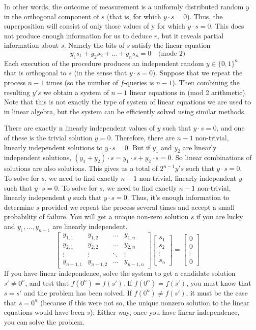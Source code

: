 \documentclass[12pt, oneside]{book}
\theoremstyle{definition}
\theoremstyle{definition}
\theoremstyle{remark}
\begin{document}
In other words, the outcome of measurement is a uniformly distributed random $y$ in the orthogonal component of $s$ (that is, for which $y\cdot s=0$). Thus, the superposition will consist of only those values of y for which $y\cdot s=0$. This does not produce enough information for us to deduce $r$, but it reveals partial information about $s$. Namely the bits of $s$ satisfy the linear equation
\[
y_1s_1+y_2s_2+\ldots+y_ns_n = 0 \quad \text{(mode 2)}
\]
Each execution of the procedure produces an independent random $y\in\{0,1\}^n$ that is orthogonal to $s$ (in the sense that $y\cdot s=0$). Suppose that we repeat the process $n-1$ times (so the number of $f$-queries is $n-1$). Then combining the resulting $y's$ we obtain a system of $n-1$ linear equations in (mod 2 arithmetic). Note that this is not exactly the type of system of linear equations we are used to in linear algebra, but the system can be efficiently solved using similar methods. 

There are exactly n linearly independent values of $y$ such that $y\cdot s=0$, and one of these is the trivial solution $y=0$. Therefore, there are $n-1$ non-trivial, linearly independent solutions to $y\cdot s=0$. But if $y_1$ and $y_2$ are linearly independent solutions, $(y_1+y_2)\cdot s=y_1\cdot s+y_2 \cdot s=0$. So linear combinations of solutions are also solutions. This gives us a total of $2^{n-1}y's$ such that $y\cdot s=0$. To solve for $s$, we need to find exactly $n-1$ non-trivial, linearly independent $y$ such that $y\cdot s=0$. To solve for $s$, we need to find exactly $n-1$ non-trivial, linearly independent $y$ such that $y\cdot s=0$. Thus, it's enough information to determine $s$ provided we repeat the process several times and accept a small probability of failure.  You will get a unique non-zero solution $s$ if you are lucky and $y_1,\ldots,y_{n-1}$ are linearly independent.
\[
\begin{bmatrix} y_{1,1} & y_{1,2}  & \ldots & y_{1,n} \\ 
y_{2,1} & y_{2,2} & \ldots & y_{2,n} \\ \vdots & \vdots & \ddots & \vdots \\ y_{n-1,1} & y_{n-1,2} & \ldots & y_{n-1,n} \end{bmatrix}\begin{bmatrix} s_1 \\ s_2 \\ \vdots \\ s_n \end{bmatrix}=\begin{bmatrix}0 \\ 0 \\ \vdots \\ 0 \end{bmatrix}
\]
If you have linear independence, solve the system to get a candidate solution $s'\neq 0^n$, and test that $f(0^n)=f(s')$. If $f(0^n)=f(s')$, you must know that $s=s'$ and the problem has been solved. If $f(0^n)\neq f(s')$, it must be the case that $s=0^n$ (because if this were not so, the unique nonzero solution to the linear equations would have been $s$). Either way, once you have linear independence, you can solve the problem.
\end{document}
